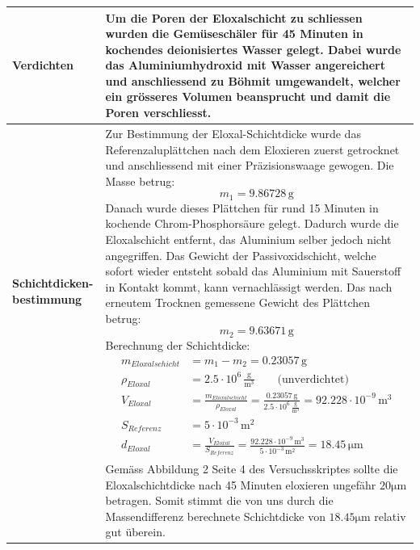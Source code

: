 \begin{longtable}{p{3cm}p{14cm}}
    \textbf{Verdichten}
    & Um die Poren der Eloxalschicht zu schliessen wurden die Gemüseschäler für 45 Minuten in kochendes deionisiertes Wasser gelegt. Dabei wurde das Aluminiumhydroxid mit Wasser angereichert und anschliessend zu Böhmit umgewandelt, welcher ein grösseres Volumen beansprucht und damit die Poren verschliesst.\\
    \hline
    
    \textbf{Schichtdicken-bestimmung}
    & Zur Bestimmung der Eloxal-Schichtdicke wurde das Referenzaluplättchen nach dem Eloxieren zuerst getrocknet und anschliessend mit einer Präzisionswaage gewogen. Die Masse betrug: $$ m_1 = 9.86728 \, \mathrm{g}$$
    Danach wurde dieses Plättchen für rund 15 Minuten in kochende Chrom-Phosphorsäure gelegt. Dadurch wurde die Eloxalschicht entfernt, das Aluminium selber jedoch nicht angegriffen. Das Gewicht der Passivoxidschicht, welche sofort wieder entsteht sobald das Aluminium mit Sauerstoff in Kontakt kommt, kann vernachlässigt werden. Das nach erneutem Trocknen gemessene Gewicht des Plättchen betrug: $$ m_2 = 9.63671 \, \mathrm{g}$$
    Berechnung der Schichtdicke:
    $$ \begin{aligned}
            m_{Eloxalschicht} &= m_1 - m_2 = 0.23057 \, \mathrm{g}\\
            \rho_{Eloxal} &= 2.5\cdot 10^{6} \, \frac{\mathrm{g}}{\mathrm{m}^3} \qquad \text{(unverdichtet)}\\
            V_{Eloxal} &= \frac{m_{Eloxalschicht}}{\rho_{Eloxal}} = \frac{0.23057 \, \mathrm{g}}{2.5\cdot 10^{6} \, \frac{\mathrm{g}}{\mathrm{m}^3}} = 92.228 \cdot 10^{-9} \, \mathrm{m^3}\\
            S_{Referenz} &= 5 \cdot 10^{-3} \, \mathrm{m^2}\\
            d_{Eloxal} &= \frac{V_{Eloxal}}{S_{Referenz}} = \frac{92.228 \cdot 10^{-9} \, \mathrm{m^3}}{5 \cdot 10^{-3} \, \mathrm{m^2}}= 18.45 \, \mathrm{\mu m}
       \end{aligned}$$\\
    & Gemäss Abbildung 2 Seite 4 des Versuchsskriptes sollte die Eloxalschichtdicke nach 45 Minuten eloxieren ungefähr $20 \mathrm{\mu m}$ betragen. Somit stimmt die von uns durch die Massendifferenz berechnete Schichtdicke von $18.45 \mathrm{\mu m}$ relativ gut überein.\\
    \hline
\end{longtable}

